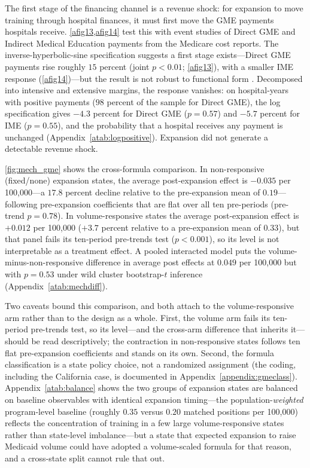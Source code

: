 The first stage of the financing channel is a revenue shock: for expansion to move training through hospital finances, it must first move the GME payments hospitals receive. \cref{afig13,afig14} test this with event studies of Direct GME and Indirect Medical Education payments from the Medicare cost reports. The inverse-hyperbolic-sine specification suggests a first stage exists---Direct GME payments rise roughly $15$ percent (joint $p < 0.01$; \cref{afig13}), with a smaller IME response (\cref{afig14})---but the result is not robust to functional form \autocite{chen2024logs}. Decomposed into intensive and extensive margins, the response vanishes: on hospital-years with positive payments ($98$ percent of the sample for Direct GME), the log specification gives $-4.3$ percent for Direct GME ($p = 0.57$) and $-5.7$ percent for IME ($p = 0.55$), and the probability that a hospital receives any payment is unchanged (Appendix~\cref{atab:logpositive}). Expansion did not generate a detectable revenue shock. 

\cref{fig:mech_gme} shows the cross-formula comparison. In non-responsive (fixed/none) expansion states, the average post-expansion effect is $-0.035$ per 100{,}000---a $17.8$ percent decline relative to the pre-expansion mean of $0.19$---following pre-expansion coefficients that are flat over all ten pre-periods (pre-trend $p = 0.78$). In volume-responsive states the average post-expansion effect is $+0.012$ per 100{,}000 ($+3.7$ percent relative to a pre-expansion mean of $0.33$), but that panel fails its ten-period pre-trends test ($p < 0.001$), so its level is not interpretable as a treatment effect. A pooled interacted model puts the volume-minus-non-responsive difference in average post effects at $0.049$ per 100{,}000 but with $p = 0.53$ under wild cluster bootstrap-$t$ inference (Appendix~\cref{atab:mechdiff}).

Two caveats bound this comparison, and both attach to the volume-responsive arm rather than to the design as a whole. First, the volume arm fails its ten-period pre-trends test, so its level---and the cross-arm difference that inherits it---should be read descriptively; the contraction in non-responsive states follows ten flat pre-expansion coefficients and stands on its own. Second, the formula classification is a state policy choice, not a randomized assignment (the coding, including the California case, is documented in Appendix~\cref{appendix:gmeclass}). Appendix~\cref{atab:balance} shows the two groups of expansion states are balanced on baseline observables with identical expansion timing---the population-\emph{weighted} program-level baseline (roughly $0.35$ versus $0.20$ matched positions per 100{,}000) reflects the concentration of training in a few large volume-responsive states rather than state-level imbalance---but a state that expected expansion to raise Medicaid volume could have adopted a volume-scaled formula for that reason, and a cross-state split cannot rule that out.

